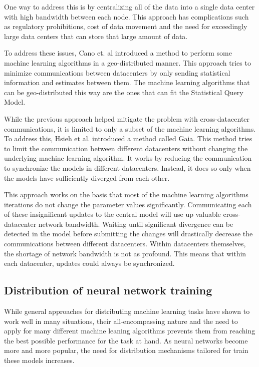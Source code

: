 \documentclass[11pt]{article}       %
\begin{document}
One way to address this is by centralizing all of the data into a single data center with high bandwidth between each node. This approach has complications such as regulatory prohibitions, cost of data movement and the need for exceedingly large data centers that can store that large amount of data. 

To address these issues, Cano et. al\cite{cano2016towards} introduced a method to perform some machine learning algorithms in a geo-distributed manner. This approach tries to minimize communications between datacenters by only sending statistical information and estimates between them. The machine learning algorithms that can be geo-distributed this way are the ones that can fit the Statistical Query Model\cite{kearns1998efficient}.

While the previous approach helped mitigate the problem with cross-datacenter communications, it is limited to only a subset of the machine learning algorithms. To address this, Hsieh et al.\cite{hsieh2017gaia} introduced a method called Gaia. This method tries to limit the communication between different datacenters without changing the underlying machine learning algorithm. It works by reducing the communication to synchronize the models in different datacenters. Instead, it does so only when the models have sufficiently diverged from each other.

This approach works on the basis that most of the machine learning algorithms iterations do not change the parameter values significantly. Communicating each of these insignificant updates to the central model will use up valuable cross-datacenter network bandwidth. Waiting until significant divergence can be detected in the model before submitting the changes will drastically decrease the communications between different datacenters. Within datacenters themselves, the shortage of network bandwidth is not as profound. This means that within each datacenter, updates could always be synchronized.

\subsection{Distribution of neural network training}

While general approaches for distributing machine learning tasks have shown to work well in many situations, their all-encompassing nature and the need to apply for many different machine leaning algorithms prevents them from reaching the best possible performance for the task at hand. As neural networks become more and more popular, the need for distribution mechanisms tailored for train these models increases.
\end{document}
